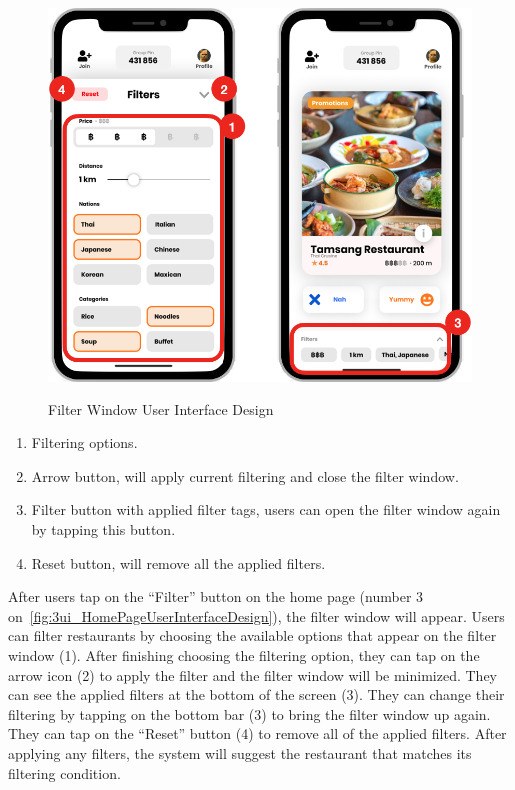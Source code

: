 \documentclass[12pt,oneside,openright,a4paper]{cpe-english-project}
\begin{document}
\begin{figure}[!h]\centering
\includegraphics[height=300pt]{./images/3ui_FilterWindowUserInterfaceDesign.png}
\caption{Filter Window User Interface Design}\label{fig:3ui_FilterWindowUserInterfaceDesign}
\end{figure}
\begin{enumerate}
\item Filtering options.
\item Arrow button, will apply current filtering and close the filter window.
\item Filter button with applied filter tags, users can open the filter window again by tapping this button.
\item Reset button, will remove all the applied filters.
\end{enumerate}
After users tap on the “Filter” button on the home page (number 3 on~\ref{fig:3ui_HomePageUserInterfaceDesign}), the filter window will appear. Users can filter restaurants by choosing the available options that appear on the filter window (1). After finishing choosing the filtering option, they can tap on the arrow icon (2) to apply the filter and the filter window will be minimized. They can see the applied filters at the bottom of the screen (3). They can change their filtering by tapping on the bottom bar (3) to bring the filter window up again. They can tap on the “Reset” button (4) to remove all of the applied filters. After applying any filters, the system will suggest the restaurant that matches its filtering condition.
\newpage
\end{document}

